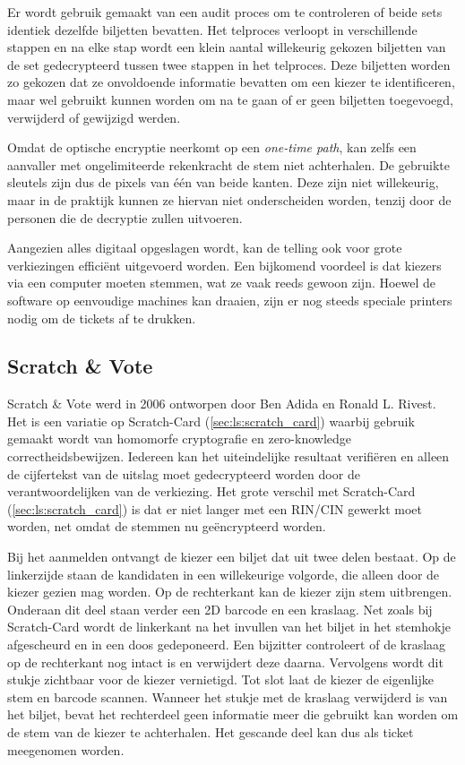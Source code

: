 \npar Er wordt gebruik gemaakt van een audit proces om te controleren of beide sets identiek dezelfde biljetten bevatten. Het telproces verloopt in verschillende stappen en na elke stap wordt een klein aantal willekeurig gekozen biljetten van de set gedecrypteerd tussen twee stappen in het telproces. Deze biljetten worden zo gekozen dat ze onvoldoende informatie bevatten om een kiezer te identificeren, maar wel gebruikt kunnen worden om na te gaan of er geen biljetten toegevoegd, verwijderd of gewijzigd werden.

\npar Omdat de optische encryptie neerkomt op een \textit{one-time path}, kan zelfs een aanvaller met ongelimiteerde rekenkracht de stem niet achterhalen. De gebruikte sleutels zijn dus de pixels van één van beide kanten. Deze zijn niet willekeurig, maar in de praktijk kunnen ze hiervan niet onderscheiden worden, tenzij door de personen die de decryptie zullen uitvoeren.

\npar Aangezien alles digitaal opgeslagen wordt, kan de telling ook voor grote verkiezingen effici\"ent uitgevoerd worden. Een bijkomend voordeel is dat kiezers via een computer moeten stemmen, wat ze vaak reeds gewoon zijn. Hoewel de software op eenvoudige machines kan draaien, zijn er nog steeds speciale printers nodig om de tickets af te drukken. 

\subsection[Scratch \& Vote]{Scratch \& Vote~\cite{adida_rivest_scratch_and_vote}}
\label{sec:ls:scratch_and_vote}

Scratch \& Vote werd in 2006 ontworpen door Ben Adida en Ronald L. Rivest. Het is een variatie op Scratch-Card (\ref{sec:ls:scratch_card}) waarbij gebruik gemaakt wordt van homomorfe cryptografie en zero-knowledge correctheidsbewijzen. Iedereen kan het uiteindelijke resultaat verifi\"eren en alleen de cijfertekst van de uitslag moet gedecrypteerd worden door de verantwoordelijken van de verkiezing. Het grote verschil met Scratch-Card (\ref{sec:ls:scratch_card}) is dat er niet langer met een RIN/CIN gewerkt moet worden, net omdat de stemmen nu ge\"encrypteerd worden.

\npar Bij het aanmelden ontvangt de kiezer een biljet dat uit twee delen bestaat. Op de linkerzijde staan de kandidaten in een willekeurige volgorde, die alleen door de kiezer gezien mag worden. Op de rechterkant kan de kiezer zijn stem uitbrengen. Onderaan dit deel staan verder een 2D barcode en een kraslaag. Net zoals bij Scratch-Card wordt de linkerkant na het invullen van het biljet in het stemhokje afgescheurd en in een doos gedeponeerd. Een bijzitter controleert of de kraslaag op de rechterkant nog intact is en verwijdert deze daarna. Vervolgens wordt dit stukje zichtbaar voor de kiezer vernietigd. Tot slot laat de kiezer de eigenlijke stem en barcode scannen. Wanneer het stukje met de kraslaag verwijderd is van het biljet, bevat het rechterdeel geen informatie meer die gebruikt kan worden om de stem van de kiezer te achterhalen. Het gescande deel kan dus als ticket meegenomen worden.

